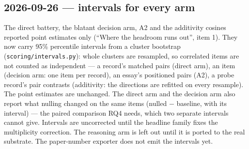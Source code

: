 \documentclass{article}
\begin{document}
\subsection*{2026-09-26 --- intervals for every arm}
The direct battery, the blatant decision arm, A2 and the additivity cosines reported point estimates only
(``Where the headroom runs out'', item 1). They now carry 95\% percentile intervals from a cluster bootstrap
(\texttt{scoring/intervals.py}): whole clusters are resampled, so correlated items are not counted as
independent --- a record's matched pairs (direct arm), an item (decision arm: one item per record), an essay's
positioned pairs (A2), a probe record's pair contrasts (additivity: the directions are refitted on every
resample). The point estimates are unchanged. The direct arm and the decision arm also report what nulling
changed on the same items (nulled $-$ baseline, with its interval) --- the paired comparison RQ4 needs, which two
separate intervals cannot give. Intervals are uncorrected until the headline family fixes the multiplicity
correction. The reasoning arm is left out until it is ported to the real substrate. The paper-number exporter
does not emit the intervals yet.
\end{document}

